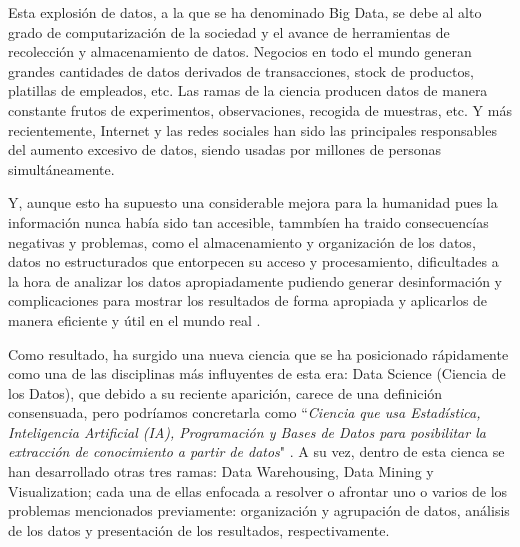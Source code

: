 \documentclass[3p,twocolumn]{elsarticle}
\begin{document}
Esta explosión de datos, a la que se ha denominado Big Data, se debe al alto grado de computarización de la sociedad y el avance de herramientas de recolección y almacenamiento de datos. Negocios en todo el mundo generan grandes cantidades de datos derivados de transacciones, stock de productos,  platillas de empleados, etc. Las ramas de la ciencia producen datos de manera constante frutos de experimentos, observaciones, recogida de muestras, etc. Y más recientemente, Internet y las redes sociales han sido las principales responsables del aumento excesivo de datos, siendo usadas por millones de personas simultáneamente.

Y, aunque esto ha supuesto una considerable mejora para la humanidad pues la información nunca había sido tan accesible, tammbíen ha traido consecuencías negativas y problemas, como el almacenamiento y organización de los datos, datos no estructurados que entorpecen su acceso y procesamiento, dificultades a la hora de analizar los datos apropiadamente pudiendo generar desinformación y complicaciones para mostrar los resultados de forma apropiada y aplicarlos de manera eficiente y útil en el mundo real \cite{cita3}.

Como resultado, ha surgido una nueva ciencia que se ha posicionado rápidamente como una de las disciplinas más influyentes de esta era: Data Science (Ciencia de los Datos), que debido a su reciente aparición, carece de una definición consensuada, pero podríamos concretarla como ``\textit{Ciencia que usa Estadística, Inteligencia Artificial (IA), Programación y Bases de Datos para posibilitar la extracción de conocimiento a partir de datos}" \cite{cita4}. A su vez, dentro de esta cienca se han desarrollado otras tres ramas: Data Warehousing, Data Mining y Visualization; cada una de ellas enfocada a resolver o afrontar uno o varios de los problemas mencionados previamente: organización y agrupación de datos, análisis de los datos y presentación de los resultados, respectivamente.






 
\end{document}
